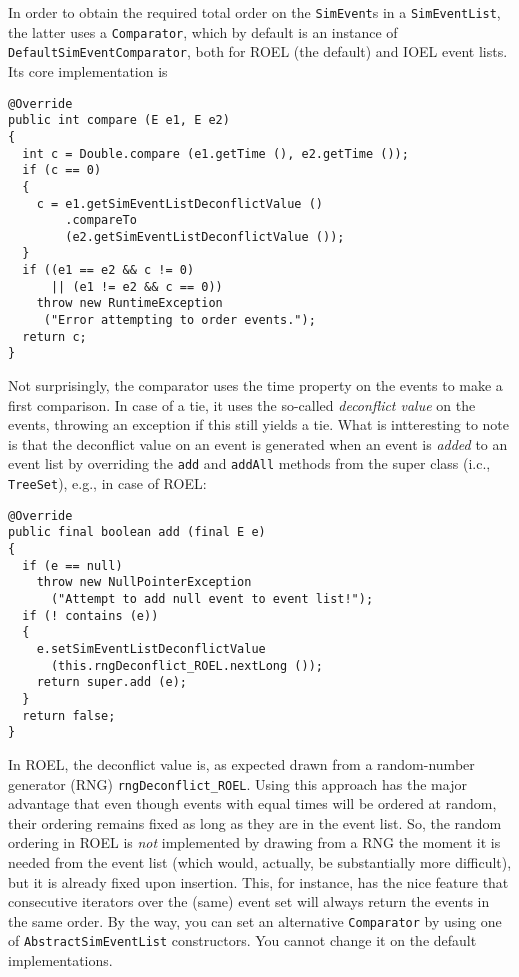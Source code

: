 \documentclass[12pt]{book}
\begin{document}
In order to obtain the required  total order on the \lstinline|SimEvent|s 
  in a \lstinline|SimEventList|,
  the latter uses a \lstinline|Comparator|,
  which by default is an instance of \lstinline|DefaultSimEventComparator|,
  both for ROEL (the default) and IOEL event lists.
Its core implementation is
\begin{lstlisting}[basicstyle=\footnotesize]
@Override
public int compare (E e1, E e2)
{
  int c = Double.compare (e1.getTime (), e2.getTime ());
  if (c == 0)
  {
    c = e1.getSimEventListDeconflictValue ()
        .compareTo
        (e2.getSimEventListDeconflictValue ());
  }
  if ((e1 == e2 && c != 0)
      || (e1 != e2 && c == 0))
    throw new RuntimeException
     ("Error attempting to order events.");
  return c;
}
\end{lstlisting}
Not surprisingly,
  the comparator uses the time property on the events to make a first
  comparison.
In case of a tie,
  it uses the so-called {\em deconflict value\/} on the events,
  throwing an exception if this still yields a tie.
What is intteresting to note is that the deconflict value
  on an event is generated when an event is {\em added\/} to
  an event list by overriding the \lstinline|add| and \lstinline|addAll|
  methods from the super class (i.c., \lstinline|TreeSet|),
  e.g., in case of ROEL:
\begin{lstlisting}[basicstyle=\footnotesize]
@Override
public final boolean add (final E e)
{
  if (e == null)
    throw new NullPointerException
      ("Attempt to add null event to event list!");
  if (! contains (e))
  {
    e.setSimEventListDeconflictValue
      (this.rngDeconflict_ROEL.nextLong ());
    return super.add (e);
  }
  return false;
}
\end{lstlisting}
In ROEL, the deconflict value is,
  as expected drawn from a random-number generator (RNG)
  \lstinline|rngDeconflict_ROEL|.
Using this approach has the major advantage that
  even though events with equal times will
  be ordered at random,
  their ordering remains fixed as long as they are
  in the event list.
So, the random ordering in ROEL is {\em not\/} implemented
  by drawing from a RNG the moment it is needed from
  the event list (which would, actually, be substantially more difficult),
  but it is already fixed upon insertion.
This, for instance, has the nice feature that
  consecutive iterators over the (same) event set will always
  return the events in the same order.
By the way, you can set an alternative \lstinline|Comparator|
  by using one of \lstinline|AbstractSimEventList| constructors.
You cannot change it on the default implementations.
\end{document}
